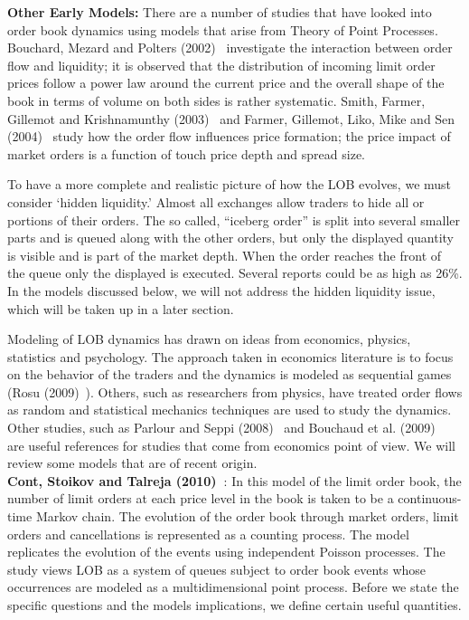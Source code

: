 \noindent \textbf{Other Early Models:} There are a number of studies that have looked into order book dynamics using models that arise from Theory of Point Processes. Bouchard, Mezard and Polters (2002)~\cite{bouchardmezard} investigate the interaction between order flow and liquidity; it is observed that the distribution of incoming limit order prices follow a power law around the current price and the overall shape of the book in terms of volume on both sides is rather systematic. Smith, Farmer, Gillemot and Krishnamunthy (2003)~\cite{smithfarm} and Farmer, Gillemot, Liko, Mike and Sen (2004)~\cite{farmermikesen} study how the order flow influences price formation; the price impact of market orders is a function of touch price depth and spread size. 


To have a more complete and realistic picture of how the LOB evolves, we must consider `hidden liquidity.' Almost all exchanges allow traders to hide all or portions of their orders. The so called, ``iceberg order'' is split into several smaller parts and is queued along with the other orders, but only the displayed quantity is visible and is part of the market depth. When the order reaches the front of the queue only the displayed is executed. Several reports could be as high as 26\%. In the models discussed below, we will not address the hidden liquidity issue, which will be taken up in a later section.


Modeling of LOB dynamics has drawn on ideas from economics, physics, statistics and psychology. The approach taken in economics literature is to focus on the behavior of the traders and the dynamics is modeled as sequential games (Rosu (2009)~\cite{irosu09}). Others, such as researchers from physics, have treated order flows as random and statistical mechanics techniques are used to study the dynamics. Other studies, such as Parlour and Seppi (2008)~\cite{parseppi} and Bouchaud et al. (2009)~\cite{bouchaud2009} are useful references for studies that come from economics point of view. We will review some models that are of recent origin. \\


\noindent\textbf{Cont, Stoikov and Talreja (2010)~\cite{contstoi}}: In this model of the limit order book, the number of limit orders at each price level in the book is taken to be a continuous-time Markov chain. The evolution of the order book through market orders, limit orders and cancellations is represented as a counting process. The model replicates the evolution of the events using independent Poisson processes. The study views LOB as a system of queues subject to order book events whose occurrences are modeled as a multidimensional point process. Before we state the specific questions and the models implications, we define certain useful quantities. 


